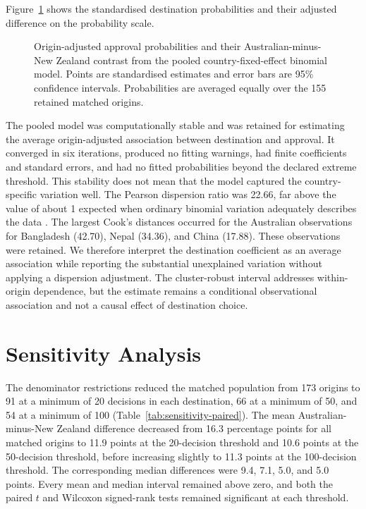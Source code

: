 \documentclass[runningheads]{llncs}
\begin{document}
Figure~\ref{fig:pooled-standardized-probabilities} shows the standardised destination probabilities and their adjusted difference on the probability scale.

\begin{figure}
\centering

\caption{Origin-adjusted approval probabilities and their Australian-minus-New Zealand contrast from the pooled country-fixed-effect binomial model. Points are standardised estimates and error bars are 95\% confidence intervals. Probabilities are averaged equally over the 155 retained matched origins.}
\label{fig:pooled-standardized-probabilities}
\end{figure}

The pooled model was computationally stable and was retained for estimating the average origin-adjusted association between destination and approval. It converged in six iterations, produced no fitting warnings, had finite coefficients and standard errors, and had no fitted probabilities beyond the declared extreme threshold. This stability does not mean that the model captured the country-specific variation well. The Pearson dispersion ratio was 22.66, far above the value of about 1 expected when ordinary binomial variation adequately describes the data \cite{Williams1982}. The largest Cook's distances \cite{Pregibon1981} occurred for the Australian observations for Bangladesh (42.70), Nepal (34.36), and China (17.88). These observations were retained. We therefore interpret the destination coefficient as an average association while reporting the substantial unexplained variation without applying a dispersion adjustment. The cluster-robust interval addresses within-origin dependence, but the estimate remains a conditional observational association and not a causal effect of destination choice.

\section{Sensitivity Analysis}

The denominator restrictions reduced the matched population from 173 origins to 91 at a minimum of 20 decisions in each destination, 66 at a minimum of 50, and 54 at a minimum of 100 (Table~\ref{tab:sensitivity-paired}). The mean Australian-minus-New Zealand difference decreased from 16.3 percentage points for all matched origins to 11.9 points at the 20-decision threshold and 10.6 points at the 50-decision threshold, before increasing slightly to 11.3 points at the 100-decision threshold. The corresponding median differences were 9.4, 7.1, 5.0, and 5.0 points. Every mean and median interval remained above zero, and both the paired $t$ and Wilcoxon signed-rank tests remained significant at each threshold.
\end{document}
